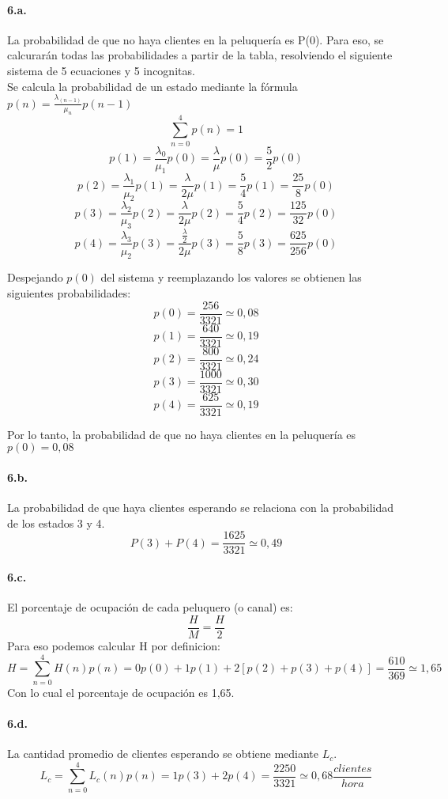 \documentclass{article}
\begin{document}
    \paragraph{6.a.} La probabilidad de que no haya clientes en la peluquería es P(0). Para eso, se calcurarán todas las probabilidades a partir de la tabla,
    resolviendo el siguiente sistema de 5 ecuaciones y 5 incognitas.\\
    Se calcula la probabilidad de un estado mediante la fórmula $p(n) = \frac{\lambda_(n-1)}{\mu_n} p(n-1)$
    $$ \sum_{n=0}^{4} p(n) = 1 $$
    $$ p(1) = \frac{\lambda_0}{\mu_1}p(0) = \frac{\lambda}{\mu}p(0) = \frac{5}{2}p(0)$$
    $$ p(2) = \frac{\lambda_1}{\mu_2}p(1) = \frac{\lambda}{2\mu}p(1) = \frac{5}{4}p(1) = \frac{25}{8}p(0)$$
    $$ p(3) = \frac{\lambda_2}{\mu_3}p(2) = \frac{\lambda}{2\mu}p(2) = \frac{5}{4}p(2) = \frac{125}{32}p(0)$$
    $$ p(4) = \frac{\lambda_3}{\mu_2}p(3) = \frac{\frac{\lambda}{2}}{2\mu}p(3) = \frac{5}{8}p(3) = \frac{625}{256}p(0)$$
    
    Despejando $p(0)$ del sistema y reemplazando los valores se obtienen las siguientes probabilidades:
    $$ p(0) = \frac{256}{3321} \simeq 0,08$$
    $$ p(1) = \frac{640}{3321} \simeq 0,19$$
    $$ p(2) = \frac{800}{3321} \simeq 0,24$$
    $$ p(3) = \frac{1000}{3321}\simeq 0,30$$
    $$ p(4) = \frac{625}{3321} \simeq 0,19$$
    
    Por lo tanto, la probabilidad de que no haya clientes en la peluquería es $p(0) = 0,08$
       
    
    \paragraph{6.b.} La probabilidad de que haya clientes esperando se relaciona con la probabilidad de los estados 3 y 4. \\
    $$P(3) + P(4) = \frac{1625}{3321} \simeq 0,49$$
    
    \paragraph{6.c.} El porcentaje de ocupación de cada peluquero (o canal) es: \\
    $$\frac{H}{M} = \frac{H}{2}$$
    Para eso podemos calcular H por definicion:
    $$H = \sum_{n=0}^{4}H(n) p(n) = 0 p(0) + 1 p(1) + 2[p(2)+p(3)+p(4)] = \frac{610}{369} \simeq 1,65 $$
    Con lo cual el porcentaje de ocupación es 1,65.    
    
    \paragraph{6.d.} La cantidad promedio de clientes esperando se obtiene mediante $L_c$.
    $$L_c = \sum_{n=0}^{4}L_c(n) p(n) = 1 p(3) + 2 p(4) = \frac{2250}{3321} \simeq 0,68 \frac{clientes}{hora}$$
    
\end{document}
